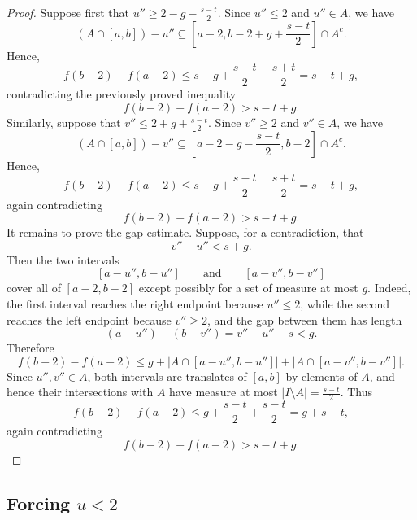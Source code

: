 \documentclass[11pt,reqno]{amsart}
\theoremstyle{definition}
\def\F#1{f(#1)}
\begin{document}
\begin{proof}
    Suppose first that $u''\geq 2-g-\frac{s-t}{2}$. Since $u''\leq 2$ and $u''\in A$, we have
    $$
        (A\cap [a,b])-u''
        \subseteq
        \left[a-2, b-2+g+\frac{s-t}{2}\right]\cap A^c .
    $$
    Hence,  
    $$
        \F{b-2}-\F{a-2}
        \leq
        s+g+\frac{s-t}{2}-\frac{s+t}{2}
        =
        s-t+g,
    $$
    contradicting the previously proved inequality
    $$
        \F{b-2}-\F{a-2}>s-t+g.
    $$
     Similarly, suppose that $v''\leq 2+g+\frac{s-t}{2}$. Since $v''\geq 2$ and $v''\in A$, we have
    $$
        (A\cap [a,b])-v''
        \subseteq
        \left[a-2-g-\frac{s-t}{2}, b-2\right]\cap A^c .
    $$
    Hence,  
    $$
        \F{b-2}-\F{a-2}
        \leq
        s+g+\frac{s-t}{2}-\frac{s+t}{2}
        =
        s-t+g,
    $$
    again contradicting
    $$
        \F{b-2}-\F{a-2}>s-t+g.
    $$
    It remains to prove the gap estimate. Suppose, for a contradiction, that
    $$
        v''-u''<s+g.
    $$
    Then the two intervals
    $$
        [a-u'',b-u'']
        \qquad\text{and}\qquad
        [a-v'',b-v'']
    $$
    cover all of $[a-2,b-2]$ except possibly for a set of measure at most $g$. Indeed, the first interval reaches the right endpoint because $u''\leq 2$, while the second reaches the left endpoint because $v''\geq 2$, and the gap between them has length
    $$
        (a-u'')-(b-v'')=v''-u''-s<g.
    $$
    Therefore
    $$
        \F{b-2}-\F{a-2}
        \leq
        g
        + |A\cap [a-u'',b-u'']|
        + |A\cap [a-v'',b-v'']|.
    $$
    Since $u'',v''\in A$, both intervals are translates of $[a,b]$ by elements of $A$, and hence their intersections with $A$ have measure at most $|I\setminus A|=\frac{s-t}{2}$. Thus
    $$
        \F{b-2}-\F{a-2}
        \leq
        g+\frac{s-t}{2}+\frac{s-t}{2}
        =
        g+s-t,
    $$
    again contradicting
    $$
        \F{b-2}-\F{a-2}>s-t+g.
    $$
\end{proof}
\subsection{Forcing $u<2$}
\end{document}
